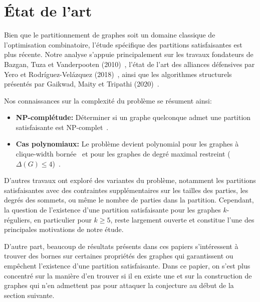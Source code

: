 \section{État de l'art}\label{sec:art}
Bien que le partitionnement de graphes soit un domaine classique de l'optimisation combinatoire, l'étude spécifique des partitions satisfaisantes est plus récente. 
Notre analyse s'appuie principalement sur les travaux fondateurs de Bazgan, Tuza et Vanderpooten (2010)~\cite{bazgan2010satisfactory}, l'état de l'art des alliances défensives par Yero et Rodríguez-Velázquez (2018)~\cite{yero2013defensive}, ainsi que les algorithmes structurels présentés par Gaikwad, Maity et Tripathi (2020)~\cite{gaikwad2020satisfactory}.

Nos connaissances sur la complexité du problème se résument ainsi:
\begin{itemize}
    \item \textbf{NP-complétude:} Déterminer si un graphe quelconque admet une partition satisfaisante est NP-complet~\cite{yero2013defensive}.
    \item \textbf{Cas polynomiaux:} Le problème devient polynomial pour les graphes à clique-width bornée~\cite{gaikwad2020satisfactory} et pour les graphes de degré maximal restreint ($\Delta(G) \leq 4$)~\cite{bazgan2010satisfactory}.
\end{itemize}

D'autres travaux ont exploré des variantes du problème, notamment les partitions satisfaisantes avec des contraintes supplémentaires sur les tailles des parties, les degrés des sommets, ou même le nombre de parties dans la partition.
Cependant, la question de l'existence d'une partition satisfaisante pour les graphes \(k\)-réguliers, en particulier pour \(k \geq 5\), reste largement ouverte et constitue l'une des principales motivations de notre étude.

D'autre part, beaucoup de résultats présents dans ces papiers s'intéressent à trouver des bornes sur certaines propriétés des graphes qui garantissent ou empêchent l'existence d'une partition satisfaisante.
Dans ce papier, on s'est plus concentré sur la manière d'en trouver si il en existe une et sur la construction de graphes qui n'en admettent pas pour attaquer la conjecture au début de la section suivante.